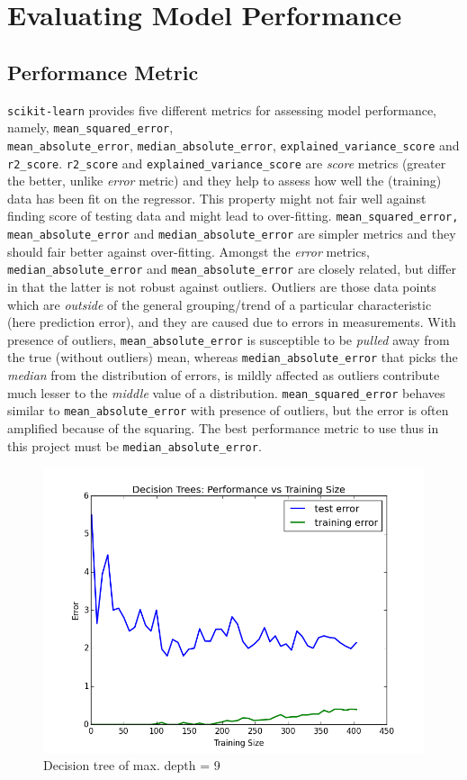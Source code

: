 \documentclass{article}
\begin{document}
	\section{Evaluating Model Performance}
	\subsection{Performance Metric}
	\texttt{scikit-learn} provides five different metrics for assessing model performance, namely, \texttt{mean\_squared\_error}, \\ \texttt{mean\_absolute\_error}, \texttt{median\_absolute\_error}, \texttt{explained\_variance\_score} and \texttt{r2\_score}. \texttt{r2\_score} and \texttt{explained\_variance\_score} are \emph{score} metrics (greater the better, unlike \emph{error} metric) and they help to assess how well the (training) data has been fit on the regressor. This property might not fair well against finding score of testing data and might lead to over-fitting. \texttt{mean\_squared\_error, mean\_absolute\_error} and \texttt{median\_absolute\_error} are simpler metrics and they should fair better against over-fitting. Amongst the \emph{error} metrics, \texttt{median\_absolute\_error} and \texttt{mean\_absolute\_error} are closely related, but differ in that the latter is not robust against outliers. Outliers are those data points which are \emph{outside} of the general grouping/trend of a particular characteristic (here prediction error), and they are caused due to errors in measurements. With presence of outliers, \texttt{mean\_absolute\_error} is susceptible to be \emph{pulled} away from the true (without outliers) mean, whereas \texttt{median\_absolute\_error} that picks the \emph{median} from the distribution of errors, is mildly affected as outliers contribute much lesser to the \emph{middle} value of a distribution. \texttt{mean\_squared\_error} behaves similar to \texttt{mean\_absolute\_error} with presence of outliers, but the error is often amplified because of the squaring. The best performance metric to use thus in this project must be \texttt{median\_absolute\_error}. 
	\begin{figure}[!ht]
		\centering
		\includegraphics[scale=0.5]{example_decision_tree_error_graph_depth_9}
		\caption{Decision tree of max. depth = 9}
		\label{fig:decisionTreeDepth9}
	\end{figure}
\end{document}
